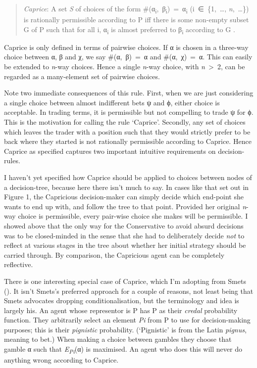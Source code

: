 \documentclass[
  10pt,
  letterpaper,
  DIV=11,
  numbers=noendperiod,
  twoside]{scrartcl}
\begin{document}
\begin{quote}
\emph{Caprice}: A set \emph{S} of choices of the form
\#(α\textsubscript{i},~β\textsubscript{i})~=~α\textsubscript{i}
(i~∈~\{1,~\ldots, \emph{n},~\ldots\}) is rationally permissible
according to P iff there is some non-empty subset G of P such that for
all i, α\textsubscript{i} is almost preferred to β\textsubscript{i}
according to G .
\end{quote}

Caprice is only defined in terms of pairwise choices. If α is chosen in
a three-way choice between α, β and χ, we say \#(α,~β)~=~α and
\#(α,~χ)~=~α. This can easily be extended to \emph{n}-way choices. Hence
a single \emph{n}-way choice, with \emph{n}~\textgreater~2, can be
regarded as a many-element set of pairwise choices.

Note two immediate consequences of this rule. First, when we are just
considering a single choice between almost indifferent bets ψ and ϕ,
either choice is acceptable. In trading terms, it is permissible but not
compelling to trade ψ for ϕ. This is the motivation for calling the rule
`Caprice'. Secondly, any set of choices which leaves the trader with a
position such that they would strictly prefer to be back where they
started is not rationally permissible according to Caprice. Hence
Caprice as specified captures two important intuitive requirements on
decision-rules.

I haven't yet specified how Caprice should be applied to choices between
nodes of a decision-tree, because here there isn't much to say. In cases
like that set out in Figure 1, the Capricious decision-maker can simply
decide which end-point she wants to end up with, and follow the tree to
that point. Provided her original \emph{n}-way choice is permissible,
every pair-wise choice she makes will be permissible. I showed above
that the only way for the Conservative to avoid absurd decisions was to
be closed-minded in the sense that she had to deliberately decide
\emph{not} to reflect at various stages in the tree about whether her
initial strategy should be carried through. By comparison, the
Capricious agent can be completely reflective.

There is one interesting special case of Caprice, which I'm adopting
from Smets (). It isn't Smets's preferred
approach for a couple of reasons, not least being that Smets advocates
dropping conditionalisation, but the terminology and idea is largely
his. An agent whose representor is P has P as their \emph{credal}
probability function. They arbitrarily select an element \emph{Pi} from
P to use for decision-making purposes; this is their \emph{pignistic}
probability. (`Pignistic' is from the Latin \emph{pignus}, meaning to
bet.) When making a choice between gambles they choose that gamble α
such that \emph{E\textsubscript{Pi}}(α) is maximised. An agent who does
this will never do anything wrong according to Caprice.
\end{document}
